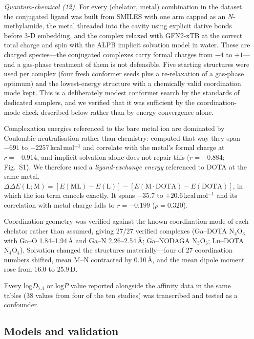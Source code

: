 \documentclass[twoside,twocolumn,9pt]{article}
\begin{document}
\emph{Quantum-chemical (12).} For every (chelator, metal) combination in the dataset the conjugated ligand was built from SMILES with one arm capped as an $N$-methylamide, the metal threaded into the cavity using explicit dative bonds before 3-D embedding, and the complex relaxed with GFN2-xTB\cite{Bannwarth2019,Bannwarth2020} at the correct total charge and spin with the ALPB implicit solvation model\cite{Ehlert2021ALPB} in water. These are charged species---the conjugated complexes carry formal charges from $-4$ to $+1$---and a gas-phase treatment of them is not defensible. Five starting structures were used per complex (four fresh conformer seeds plus a re-relaxation of a gas-phase optimum) and the lowest-energy structure with a chemically valid coordination mode kept. This is a deliberately modest conformer search by the standards of dedicated samplers,\cite{Pracht2024CREST} and we verified that it was sufficient by the coordination-mode check described below rather than by energy convergence alone.

Complexation energies referenced to the bare metal ion are dominated by Coulombic neutralisation rather than chemistry: computed that way they span $-691$ to $-2257$\,kcal\,mol$^{-1}$ and correlate with the metal's formal charge at $r = -0.914$, and implicit solvation alone does not repair this ($r = -0.884$; Fig.~S1). We therefore used a \emph{ligand-exchange energy} referenced to DOTA at the same metal, $\Delta\Delta E(\mathrm{L};\mathrm{M}) = [E(\mathrm{ML}) - E(\mathrm{L})] - [E(\mathrm{M}\cdot\mathrm{DOTA}) - E(\mathrm{DOTA})]$, in which the ion term cancels exactly. It spans $-35.7$ to $+20.6$\,kcal\,mol$^{-1}$ and its correlation with metal charge falls to $r = -0.199$ ($p = 0.320$).

Coordination geometry was verified against the known coordination mode of each chelator rather than assumed, giving 27/27 verified complexes (Ga--DOTA N$_4$O$_3$ with Ga--O 1.84--1.94\,\AA{} and Ga--N 2.26--2.54\,\AA; Ga--NODAGA N$_3$O$_3$; Lu--DOTA N$_4$O$_4$). Solvation changed the structures materially---four of 27 coordination numbers shifted, mean M--N contracted by 0.10\,\AA, and the mean dipole moment rose from 16.0 to 25.9\,D.

Every log$D_{7.4}$ or log$P$ value reported alongside the affinity data in the same tables (38 values from four of the ten studies) was transcribed and tested as a confounder.

\subsection{Models and validation}
\end{document}
